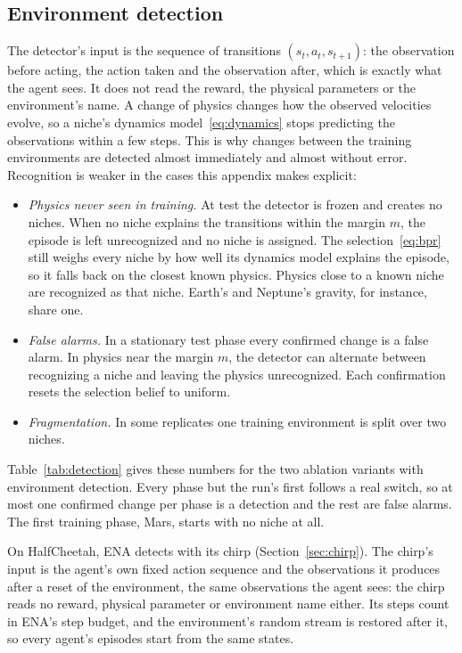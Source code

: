 \subsection{Environment detection}
\label{sec:appendix_detection}
The detector's input is the sequence of transitions $(s_t, a_t, s_{t+1})$: the observation before acting, the action taken and the observation after, which is exactly what the agent sees. It does not read the reward, the physical parameters or the environment's name. A change of physics changes how the observed velocities evolve, so a niche's dynamics model~\eqref{eq:dynamics} stops predicting the observations within a few steps. This is why changes between the training environments are detected almost immediately and almost without error. Recognition is weaker in the cases this appendix makes explicit:
\begin{itemize}
\item \textit{Physics never seen in training.} At test the detector is frozen and creates no niches. When no niche explains the transitions within the margin $m$, the episode is left unrecognized and no niche is assigned. The selection~\eqref{eq:bpr} still weighs every niche by how well its dynamics model explains the episode, so it falls back on the closest known physics. Physics close to a known niche are recognized as that niche. Earth's and Neptune's gravity, for instance, share one.
\item \textit{False alarms.} In a stationary test phase every confirmed change is a false alarm. In physics near the margin $m$, the detector can alternate between recognizing a niche and leaving the physics unrecognized. Each confirmation resets the selection belief to uniform.
\item \textit{Fragmentation.} In some replicates one training environment is split over two niches.
\end{itemize}
Table~\ref{tab:detection} gives these numbers for the two ablation variants with environment detection. Every phase but the run's first follows a real switch, so at most one confirmed change per phase is a detection and the rest are false alarms. The first training phase, Mars, starts with no niche at all.



On HalfCheetah, ENA detects with its chirp (Section~\ref{sec:chirp}). The chirp's input is the agent's own fixed action sequence and the observations it produces after a reset of the environment, the same observations the agent sees: the chirp reads no reward, physical parameter or environment name either. Its steps count in ENA's step budget, and the environment's random stream is restored after it, so every agent's episodes start from the same states.

